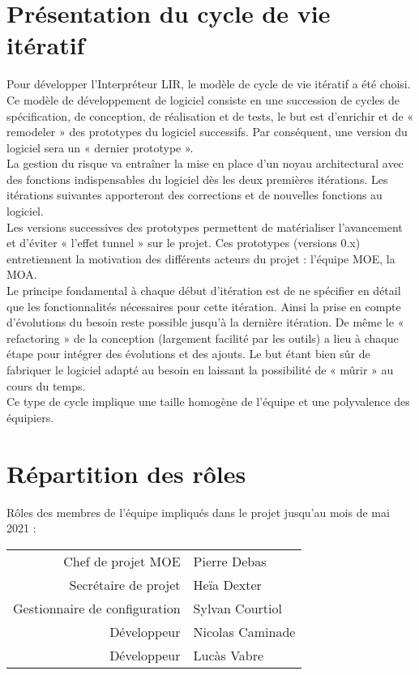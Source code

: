 
    \section{Présentation du cycle de vie itératif} %
Pour développer l’Interpréteur LIR, le modèle de cycle de vie itératif a été
choisi. Ce modèle de développement de logiciel consiste en une succession de
cycles de spécification, de conception, de réalisation et de tests, le but
est d’enrichir et de « remodeler » des prototypes du logiciel successifs. Par
conséquent, une version du logiciel sera un « dernier prototype ».
\\La gestion du risque va entraîner la mise en place d’un noyau architectural
avec des fonctions indispensables du logiciel dès les deux premières
itérations. Les itérations suivantes apporteront des corrections et de
nouvelles fonctions au logiciel.
\\Les versions successives des prototypes permettent de matérialiser
l’avancement et d’éviter « l’effet tunnel » sur le projet. Ces prototypes
(versions 0.x) entretiennent la motivation des différents acteurs du projet :
l’équipe MOE, la MOA.
\\Le principe fondamental à chaque début d’itération est de ne spécifier en
détail que les fonctionnalités nécessaires pour cette itération. Ainsi la
prise en compte d’évolutions du besoin reste possible jusqu'à la dernière
itération. De même le « refactoring » de la conception (largement facilité
par les outils) a lieu à chaque étape pour intégrer des évolutions et des
ajouts. Le but étant bien sûr de fabriquer le logiciel adapté au besoin en
laissant la possibilité de « mûrir » au cours du temps.
\\Ce type de cycle implique une taille homogène de l’équipe et une
polyvalence des équipiers.

\section{Répartition des rôles}
Rôles des membres de l’équipe impliqués dans le projet jusqu'au mois de mai
2021 :
\begin{center}
    \begin{tabular}{rl}
        Chef de projet MOE            & Pierre Debas      \\
        Secrétaire de projet          & Heïa Dexter       \\
        Gestionnaire de configuration & Sylvan Courtiol   \\
        Développeur                   & Nicolas Caminade  \\
        Développeur                   & Lucàs Vabre       \\
    \end{tabular}
\end{center}

